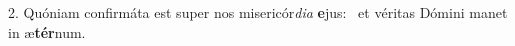 2. Quóniam confirmáta est super nos misericór\textit{di}\textit{a} \textbf{e}jus: \ast\  et véritas Dómini manet in æ\textbf{tér}num.\

